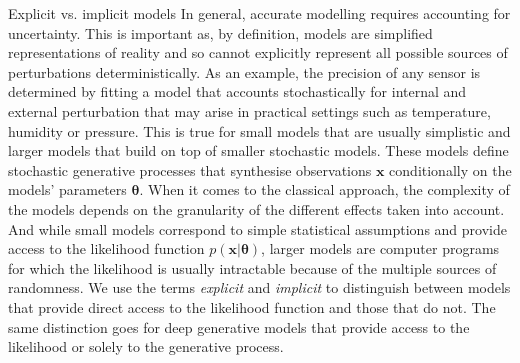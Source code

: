 

\begin{side_note}{Explicit vs. implicit models}
  In general, accurate modelling requires accounting for uncertainty. This is important as, by definition, models are simplified representations of reality and so cannot explicitly represent all possible sources of perturbations deterministically. As an example, the precision of any sensor is determined by fitting a model that accounts stochastically for internal and external perturbation that may arise in practical settings such as temperature, humidity or pressure. This is true for small models that are usually simplistic and larger models that build on top of smaller stochastic models. These models define stochastic generative processes that synthesise observations $\mathbf{x}$ conditionally on the models' parameters $\mathbf{\theta}$. When it comes to the classical approach, the complexity of the models depends on the granularity of the different effects taken into account. And while small models correspond to simple statistical assumptions and provide access to the likelihood function $p(\mathbf{x}|\mathbf{\theta})$, larger models are computer programs for which the likelihood is usually intractable because of the multiple sources of randomness. We use the terms \textit{explicit} and \textit{implicit} to distinguish between models that provide direct access to the likelihood function and those that do not. The same distinction goes for deep generative models that provide access to the likelihood or solely to the generative process.
\end{side_note}
